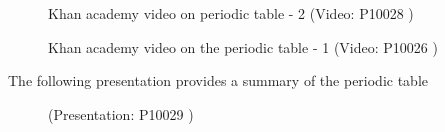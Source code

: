         \label{m38757*eip-6}
    \setcounter{subfigure}{0}
	\begin{figure}[H] %
    \textnormal{Khan academy video on periodic table - 2} \nopagebreak
  \label{m38757*yt-media3}\label{m38757*yt-video3}
             { (Video:  P10028 )}
 \end{figure}       \par 
\label{m38760*eip-148}
    \setcounter{subfigure}{0}
	\begin{figure}[H] %
    \textnormal{Khan academy video on the periodic table - 1} \nopagebreak
  \label{m38760*yt-media1}\label{m38760*yt-video1}
             { (Video:  P10026 )}
 \end{figure}       \par 
The following presentation provides a summary of the periodic table
    \setcounter{subfigure}{0}
	\begin{figure}[H] %
    \label{m38757*slidesharemedia}\label{m38757*slideshareflash} { (Presentation:  P10029 )}
 \end{figure}       \par 
    \label{m38757*eip-572}

